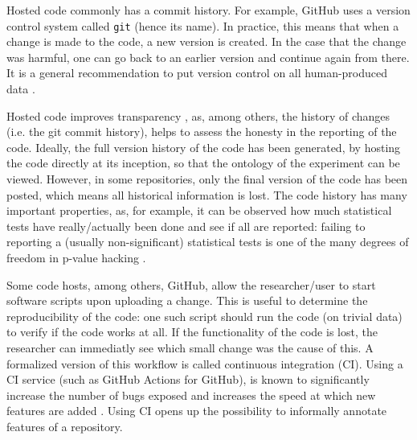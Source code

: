 
Hosted code commonly has a commit history. For example, GitHub
uses a version control system called \verb|git| (hence its name).
In practice, this means that when a change is made to the code,
a new version is created. In the case that the change was harmful,
one can go back to an earlier version and continue again from there.
It is a general recommendation to put version control
on all human-produced data \cite{wilson2014best}.


Hosted code improves transparency \cite{gorgolewski2016practical},
as, among others, the history of changes (i.e. the git commit history), 
helps to assess the honesty in the reporting of the code. 
Ideally, the full version history of the code 
has been generated, by hosting the code directly at its inception,
so that the ontology of the experiment can be viewed.
However, in some repositories, only the final version of the code has been
posted, which means all historical information is lost.
The code history has many important properties,
as, for example, 
it can be observed how much statistical tests have really/actually been done 
and see if all are reported:
failing to reporting a (usually non-significant) statistical tests is 
one of the many degrees of freedom 
in p-value hacking \cite{wicherts2016degrees}.


Some code hosts, among others, GitHub, 
allow the researcher/user to start software scripts upon uploading a change.
This is useful to determine the reproducibility of the code: 
one such script should run the code (on trivial data) 
to verify if the code works at all.
If the functionality of the code is lost, the researcher
can immediatly see which small change was the cause of this.
A formalized version of this workflow is called continuous integration (CI).
Using a CI service (such as GitHub Actions for GitHub), 
is known to significantly 
increase the number of bugs exposed \cite{vasilescu2015} and increases
the speed at which new features are added \cite{vasilescu2015}.
Using CI opens up the possibility to informally annotate features of
a repository. 

